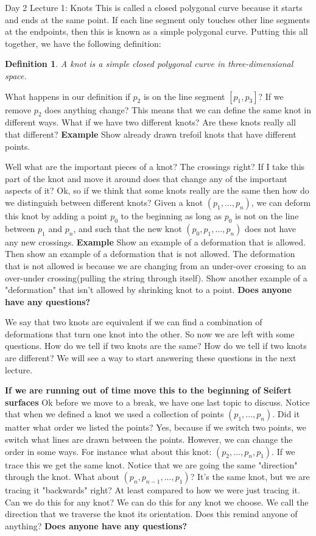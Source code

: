 \documentclass{article}
\newtheorem{definition}{Definition}
\begin{document}
\begin{section}{Day 2 Lecture 1: Knots}
	 This is called a closed polygonal curve because it starts and ends at the same point. If each line segment only touches other line segments at the endpoints, then this is known as a simple polygonal curve. Putting this all together, we have the following definition:\medbreak
	 
	 \begin{definition}
	 A knot is a simple closed polygonal curve in three-dimensional space.
	 \end{definition}
	 
	 What happens in our definition if $p_2$ is on the line segment $[p_1,p_3]$? If we remove $p_2$ does anything change? This means that we can define the same knot in different ways. What if we have two different knots? Are these knots really all that different?
	 \textbf{Example} Show already drawn trefoil knots that have different points. 
	 
	 Well what are the important pieces of a knot? The crossings right? If I take this part of the knot and move it around does that change any of the important aspects of it? Ok, so if we think that some knots really are the same then how do we distinguish between different knots? Given a knot $(p_1,...,p_n)$, we can deform this knot by adding a point $p_0$ to the beginning as long as $p_0$ is not on the line between $p_1$ and $p_n$, and such that the new knot $(p_0,p_1,...,p_n)$ does not have any new crossings.
	 \textbf{Example} Show an example of a deformation that is allowed. Then show an example of a deformation that is not allowed. The deformation that is not allowed is because we are changing from an under-over crossing to an over-under crossing(pulling the string through itself). Show another example of a "deformation" that isn't allowed by shrinking knot to a point.
	 \textbf{Does anyone have any questions?}
	 
	 We say that two knots are equivalent if we can find a combination of deformations that turn one knot into the other. So now we are left with some questions. How do we tell if two knots are the same? How do we tell if two knots are different? We will see a way to start answering these questions in the next lecture.\medbreak
	 
	 \textbf{If we are running out of time move this to the beginning of Seifert surfaces}
	 Ok before we move to a break, we have one last topic to discuss. Notice that when we defined a knot we used a collection of points $(p_1,...,p_n)$. Did it matter what order we listed the points? Yes, because if we switch two points, we switch what lines are drawn between the points. However, we can change the order in some ways. For instance what about this knot: $(p_2,...,p_n,p_1)$. If we trace this we get the same knot. Notice that we are going the same "direction" through the knot. What about $(p_n,p_{n-1},...,p_1)$? It's the same knot, but we are tracing it "backwards" right? At least compared to how we were just tracing it. Can we do this for any knot? We can do this for any knot we choose. We call the direction that we traverse the knot its orientation. Does this remind anyone of anything? \textbf{Does anyone have any questions?} 

\end{section}
\end{document}
